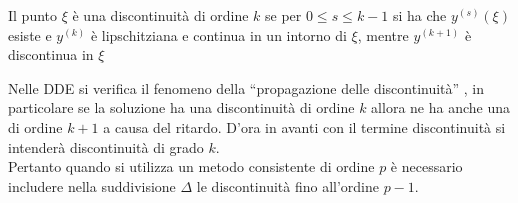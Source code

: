 \begin{defn}
 Il punto $\xi$ è una discontinuità di ordine $k$ se per $0 \le s \le k-1$ si ha che $y^{(s)}(\xi)$ esiste e $y^{(k)}$ è lipschitziana 
e continua in un intorno di $\xi$, mentre $y^{(k+1)}$ è discontinua in $\xi$ 
\end{defn}

Nelle DDE si verifica il fenomeno della ``propagazione delle discontinuità'' , in particolare se la soluzione ha una discontinuità 
di ordine $k$ allora ne ha anche una di ordine $k+1$ a causa del ritardo. D'ora in avanti con il termine discontinuità si intenderà 
discontinuità di grado $k$.
\vspace{0.5cm} \\
Pertanto quando si utilizza un metodo consistente di ordine $p$ è necessario includere nella suddivisione $\Delta$ le discontinuità 
fino all'ordine $p-1$.

